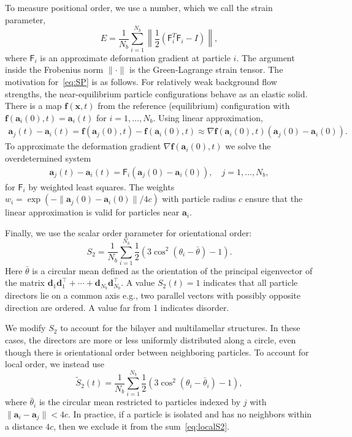 \documentclass[prb,preprint,showpacs,preprintnumbers,amsmath,amssymb,longbibliography]{revtex4-1}
\renewcommand{\aa}{\mathbf{a}}
\newcommand{\dd}{\mathbf{d}}
\newcommand{\ff}{\mathbf{f}}
\newcommand{\xx}{\mathbf{x}}
\begin{document}
To measure positional order, we use a number, which we call the strain
parameter, 
\begin{equation}
\label{eq:SP}
E = \frac{1}{N_b} \sum_{i=1}^{N_b}
\left\|\frac{1}{2}(\mathsf{F}_i^T \mathsf{F}_i - I)\right\|,
\end{equation}
where $\mathsf{F}_i$ is an approximate deformation gradient at particle
$i$. The argument inside the Frobenius norm $\| \cdot \|$ is the
Green-Lagrange strain tensor. The motivation for~\eqref{eq:SP} is as
follows. For relatively weak background flow strengths, the
near-equilibrium particle configurations behave as an elastic solid.
There is a map $\ff(\xx,t)$ from the reference (equilibrium)
configuration with $\ff(\aa_i(0),t) = \aa_i(t)$ for $i = 1,\ldots,N_b$.
Using linear approximation,
\begin{align}
\aa_j(t) - \aa_i(t) = \ff(\aa_j(0),t) - \ff(\aa_i(0),t)
\approx \nabla \ff(\aa_i(0),t)(\aa_j(0) - \aa_i(0)).
\end{align}
To approximate the deformation gradient $\nabla \ff(\aa_i(0),t)$ we
solve the overdetermined system 
\begin{align}
\aa_j(t) - \aa_i(t) = \mathsf{F}_i(\aa_j(0) - \aa_i(0)),\quad j =
  1,\ldots, N_b,
\end{align}
for $\mathsf{F}_i$ by weighted least squares. The weights $w_i =
\exp(-\|\aa_j(0) - \aa_i(0)\|/4c)$ with particle radius $c$ ensure that
the linear approximation is valid for particles near $\aa_i$.

Finally, we use the scalar order parameter for orientational order:
\begin{equation}
  \label{eq:S2}
S_2 = \frac{1}{N_b} \sum_{i=1}^{N_b} \frac{1}{2}(3\cos^2(\theta_i - \bar \theta) - 1).
\end{equation}
Here $\bar \theta$ is a circular mean defined as the orientation of the
principal eigenvector of the matrix $\dd_1\dd_1^\top + \cdots +
\dd_{N_b}\dd_{N_b}^\top$. A value $S_2(t) = 1$ indicates that all
particle directors lie on a common axis e.g., two parallel vectors with
possibly opposite direction are ordered. A value far from 1 indicates
disorder.

We modify $S_2$ to account for the bilayer and multilamellar structures.
In these cases, the directors are more or less uniformly distributed
along a circle, even though there is orientational order between
neighboring particles. To account for local order, we instead use
\begin{equation}
  \label{eq:localS2}
\tilde{S}_2(t) = \frac{1}{N_b} \sum_{i=1}^{N_b}
\frac{1}{2}(3\cos^2(\theta_i - \bar \theta_i) - 1),
\end{equation}
where $\bar \theta_i$ is the circular mean restricted to particles
indexed by $j$ with $\|\aa_i - \aa_j\| < 4c$. In practice, if a particle
is isolated and has no neighbors within a distance $4c$, then we exclude
it from the sum~\eqref{eq:localS2}. 
\end{document}
